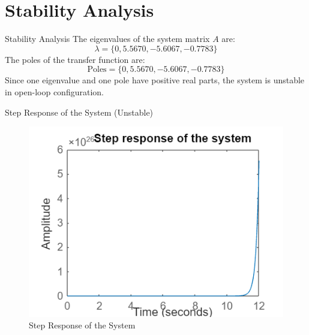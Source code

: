 \documentclass[10pt,compress,mathserif]{beamer}
\begin{document}
\section{Stability Analysis}
\begin{frame}{Stability Analysis}
The eigenvalues of the system matrix \(A\) are:
\[ \lambda = \{0, 5.5670, -5.6067, -0.7783\} \]
The poles of the transfer function are:
\[ \text{Poles} = \{0, 5.5670, -5.6067, -0.7783\} \]
Since one eigenvalue and one pole have positive real parts, the system is unstable in open-loop configuration.
\end{frame}

\begin{frame}{Step Response of the System (Unstable)}
\begin{figure}[h!]
    \centering
    \includegraphics[scale=0.5]{step.png}
    \caption{Step Response of the System}
\end{figure}
\end{frame}

\end{document}
